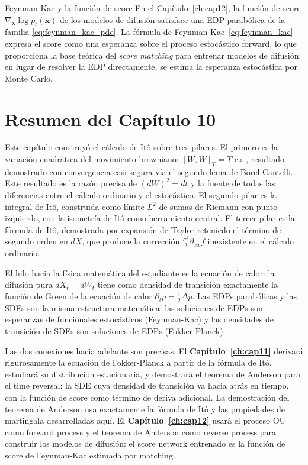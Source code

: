 \begin{observacion}{Feynman-Kac y la función de score}
En el Capítulo~\ref{ch:cap12}, la función de score $\nabla_{\bm{x}}\log p_t(\bm{x})$
de los modelos de difusión satisface una EDP parabólica de la familia
\eqref{eq:feynman_kac_pde}. La fórmula de Feynman-Kac~\eqref{eq:feynman_kac}
expresa el score como una esperanza sobre el proceso estocástico forward,
lo que proporciona la base teórica del \textit{score matching} para
entrenar modelos de difusión: en lugar de resolver la EDP directamente,
se estima la esperanza estocástica por Monte Carlo.
\end{observacion}

\section{Resumen del Capítulo 10}
\label{sec:resumen10}

Este capítulo construyó el cálculo de Itô sobre tres pilares. El primero es la
variación cuadrática del movimiento browniano: $[W,W]_T = T$ c.s., resultado
demostrado con convergencia casi segura vía el segundo lema de Borel-Cantelli.
Este resultado es la razón precisa de $(dW)^2 = dt$ y la fuente de todas las
diferencias entre el cálculo ordinario y el estocástico. El segundo pilar es
la integral de Itô, construida como límite $L^2$ de sumas de Riemann con punto
izquierdo, con la isometría de Itô como herramienta central. El tercer pilar es
la fórmula de Itô, demostrada por expansión de Taylor reteniedo el término de
segundo orden en $dX$, que produce la corrección $\frac{\sigma^2}{2}\partial_{xx}f$
inexistente en el cálculo ordinario.

El hilo hacia la física matemática del estudiante es la ecuación de calor:
la difusión pura $dX_t = dW_t$ tiene como densidad de transición exactamente
la función de Green de la ecuación de calor $\partial_t p = \frac{1}{2}\Delta p$.
Las EDPs parabólicas y las SDEs son la misma estructura matemática: las
soluciones de EDPs son esperanzas de funcionales estocásticos (Feynman-Kac)
y las densidades de transición de SDEs son soluciones de EDPs (Fokker-Planck).

Las dos conexiones hacia adelante son precisas. El \textbf{Capítulo~\ref{ch:cap11}}
derivará rigurosamente la ecuación de Fokker-Planck a partir de la fórmula
de Itô, estudiará su distribución estacionaria, y demostrará el teorema de
Anderson para el time reversal: la SDE cuya densidad de transición va hacia
atrás en tiempo, con la función de score como término de deriva adicional.
La demostración del teorema de Anderson usa exactamente la fórmula de Itô
y las propiedades de martingala desarrolladas aquí. El \textbf{Capítulo~\ref{ch:cap12}}
usará el proceso OU como forward process y el teorema de Anderson como
reverse process para construir los modelos de difusión: el score network
entrenado es la función de score de Feynman-Kac estimada por matching.

